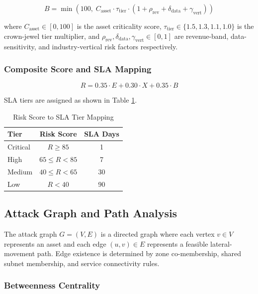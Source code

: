 \documentclass[conference]{IEEEtran}
\begin{document}
\begin{equation}
  B = \min\!\left(100,\; C_{\text{asset}} \cdot \tau_{\text{tier}} \cdot (1 + \rho_{\text{rev}} + \delta_{\text{data}} + \gamma_{\text{vert}})\right)
\end{equation}

where $C_{\text{asset}} \in [0, 100]$ is the asset criticality score, $\tau_{\text{tier}} \in \{1.5, 1.3, 1.1, 1.0\}$ is the crown-jewel tier multiplier, and $\rho_{\text{rev}}, \delta_{\text{data}}, \gamma_{\text{vert}} \in [0, 1]$ are revenue-band, data-sensitivity, and industry-vertical risk factors respectively.

\subsubsection{Composite Score and SLA Mapping}

\begin{equation}
  R = 0.35 \cdot E + 0.30 \cdot X + 0.35 \cdot B
\end{equation}

SLA tiers are assigned as shown in Table \ref{tab:sla}.

\begin{table}[h]
  \caption{Risk Score to SLA Tier Mapping}
  \label{tab:sla}
  \centering
  \begin{tabular}{@{}lcc@{}}
    \toprule
    \textbf{Tier} & \textbf{Risk Score} & \textbf{SLA Days} \\
    \midrule
    Critical & $R \geq 85$ & 1 \\
    High     & $65 \leq R < 85$ & 7 \\
    Medium   & $40 \leq R < 65$ & 30 \\
    Low      & $R < 40$ & 90 \\
    \bottomrule
  \end{tabular}
\end{table}

\subsection{Attack Graph and Path Analysis}

The attack graph $G = (V, E)$ is a directed graph where each vertex $v \in V$ represents an asset and each edge $(u, v) \in E$ represents a feasible lateral-movement path. Edge existence is determined by zone co-membership, shared subnet membership, and service connectivity rules.

\subsubsection{Betweenness Centrality}
\end{document}
